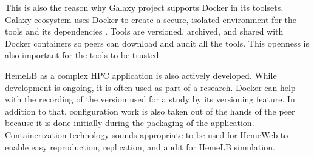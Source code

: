 This is also the reason why Galaxy project supports Docker in its toolsets. Galaxy ecosystem uses Docker to create a secure, isolated environment for the tools and its dependencies \citep{moreews2015curated}. Tools are versioned, archived, and shared with Docker containers so peers can download and audit all the tools. This openness is also important for the tools to be trusted.

HemeLB as a complex HPC application is also actively developed. While development is ongoing, it is often used as part of a research. Docker can help with the recording of the version used for a study by its versioning feature. In addition to that, configuration work is also taken out of the hands of the peer because it is done initially during the packaging of the application. Containerization technology sounds appropriate to be used for HemeWeb to enable easy reproduction, replication, and audit for HemeLB simulation.






%
%
%

